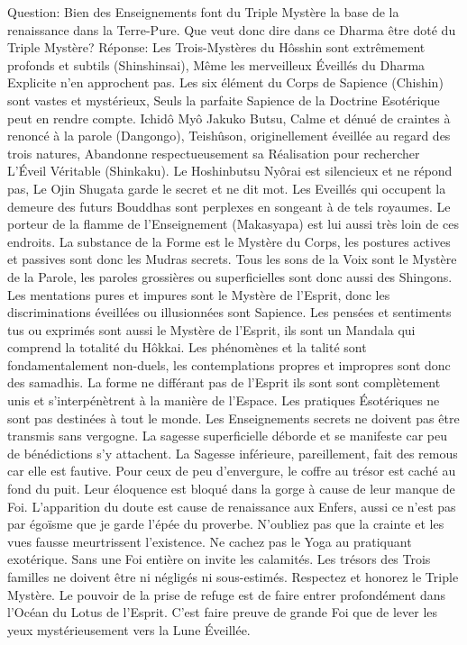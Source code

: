 Question: 
Bien des Enseignements font du Triple Mystère la base de la renaissance dans la Terre-Pure. Que veut donc dire dans ce Dharma être doté du Triple Mystère?
Réponse:
Les Trois-Mystères du Hôsshin sont extrêmement profonds et subtils (Shinshinsai), 
Même les merveilleux Éveillés du Dharma Explicite n'en approchent pas.
Les six élément du Corps de Sapience (Chishin) sont vastes et mystérieux, 
Seuls la parfaite Sapience de la Doctrine Esotérique peut en rendre compte. 
Ichidô Myô Jakuko Butsu, Calme et dénué de craintes à renoncé à la parole (Dangongo),
Teishûson, originellement éveillée au regard des trois natures,
Abandonne respectueusement sa Réalisation pour rechercher L’Éveil Véritable (Shinkaku). 
Le Hoshinbutsu Nyôrai est silencieux et ne répond pas, Le Ojin Shugata garde le secret et ne dit mot. 
Les Eveillés qui occupent la demeure des futurs Bouddhas sont perplexes en songeant à de tels royaumes. 
Le porteur de la flamme de l'Enseignement (Makasyapa) est lui aussi très loin de ces endroits.
La substance de la Forme est le Mystère du Corps, les postures actives et passives sont donc les Mudras secrets. Tous les sons de la Voix sont le Mystère de la Parole, les paroles grossières ou superficielles sont donc aussi des Shingons. Les mentations pures et impures sont le Mystère de l'Esprit, donc les discriminations éveillées ou illusionnées sont Sapience. Les pensées et sentiments tus ou exprimés sont aussi le Mystère de l'Esprit, ils sont un Mandala qui comprend la totalité du Hôkkai. Les phénomènes et la talité sont fondamentalement non-duels, les contemplations propres et impropres sont donc des samadhis. La forme ne différant pas de l'Esprit ils sont sont complètement unis et s'interpénètrent à la manière de l'Espace.
Les pratiques Ésotériques ne sont pas destinées à tout le monde. Les Enseignements secrets ne doivent pas être transmis sans vergogne. La sagesse superficielle déborde et se manifeste car peu de bénédictions s'y attachent. La Sagesse inférieure, pareillement, fait des remous car elle est fautive. Pour ceux de peu d'envergure, le coffre au trésor est caché au fond du puit. Leur éloquence est bloqué dans la gorge à cause de leur manque de Foi.
L'apparition du doute est cause de renaissance aux Enfers, aussi ce n'est pas par égoïsme que je garde l'épée du proverbe. N'oubliez pas que la crainte et les vues fausse meurtrissent l'existence. Ne cachez pas le Yoga au pratiquant exotérique. Sans une Foi entière on invite les calamités. Les trésors des Trois familles ne doivent être ni négligés ni sous-estimés. Respectez et honorez le Triple Mystère. Le pouvoir de la prise de refuge est de faire entrer profondément dans l'Océan du Lotus de l'Esprit. C'est faire preuve de grande Foi que de lever les yeux mystérieusement vers la Lune Éveillée.

